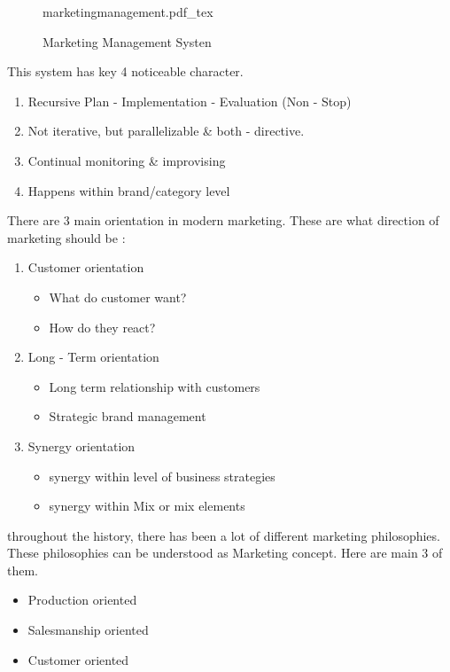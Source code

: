 \documentclass[12pt]{article}
\begin{document}
\begin{figure}[H]
	\centering
	\def\svgwidth{\columnwidth}
	{marketingmanagement.pdf_tex}
	\caption{Marketing Management Systen}
	\label{fig:marketingmanagement}
\end{figure}

This system has key 4 noticeable character.
\begin{enumerate}
	\item Recursive Plan - Implementation - Evaluation (Non - Stop)
	\item Not iterative, but parallelizable \& both - directive.
	\item Continual monitoring \& improvising
	\item Happens within brand/category level
\end{enumerate}

There are 3 main orientation in modern marketing. These are what direction of marketing should be :
\begin{enumerate}
	\item Customer orientation
	\begin{itemize}
		\item What do customer want?
		\item How do they react?
	\end{itemize}
	\item Long - Term orientation
	\begin{itemize}
		\item Long term relationship with customers
		\item Strategic brand management
	\end{itemize}
	\item Synergy orientation
	\begin{itemize}
		\item synergy within level of business strategies
		\item synergy within Mix or mix elements
	\end{itemize}
\end{enumerate}

throughout the history, there has been a lot of different marketing philosophies. These philosophies can be understood as Marketing concept. Here are main 3 of them.
\begin{itemize}
	\item Production oriented
	\item Salesmanship oriented
	\item Customer oriented
\end{itemize}
\end{document}

